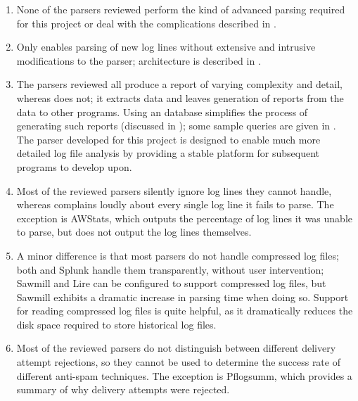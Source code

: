 \begin{enumerate}

    \item None of the parsers reviewed perform the kind of advanced parsing
        required for this project or deal with the complications described
        in .

    \item Only \parsername{} enables parsing of new log lines without
        extensive and intrusive modifications to the parser; \parsernames{}
        architecture is described in .

    \item The parsers reviewed all produce a report of varying complexity
        and detail, whereas \parsername{} does not; it extracts data and
        leaves generation of reports from the data to other programs.
        Using an  database simplifies the process of
        generating such reports (discussed in ); some sample queries are given in .
        The parser developed for this project is designed to enable much
        more detailed log file analysis by providing a stable platform for
        subsequent programs to develop upon.

    \item Most of the reviewed parsers silently ignore log lines they
        cannot handle, whereas \parsername{} complains loudly about every
        single log line it fails to parse.  The exception is AWStats, which
        outputs the percentage of log lines it was unable to parse, but
        does not output the log lines themselves.

    \item A minor difference is that most parsers do not handle compressed
        log files; both \parsername{} and Splunk handle them transparently,
        without user intervention; Sawmill and Lire can be configured to
        support compressed log files, but Sawmill exhibits a dramatic
        increase in parsing time when doing so.  Support for reading
        compressed log files is quite helpful, as it dramatically reduces
        the disk space required to store historical log files.

    \item Most of the reviewed parsers do not distinguish between different
        delivery attempt rejections, so they cannot be used to determine
        the success rate of different anti-spam techniques.  The exception
        is Pflogsumm, which provides a summary of why delivery attempts
        were rejected.

\end{enumerate}

